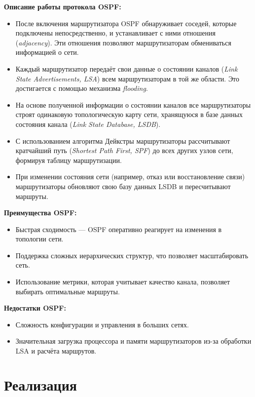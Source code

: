 \documentclass[a4paper,14pt]{extarticle}
\begin{document}
\textbf{Описание работы протокола OSPF:}
\begin{itemize}
    \item После включения маршрутизатора OSPF обнаруживает соседей, которые подключены непосредственно, и устанавливает с ними отношения (\textit{adjacency}). Эти отношения позволяют маршрутизаторам обмениваться информацией о сети.
    \item Каждый маршрутизатор передаёт свои данные о состоянии каналов (\textit{Link State Advertisements, LSA}) всем маршрутизаторам в той же области. Это достигается с помощью механизма \textit{flooding}.
    \item На основе полученной информации о состоянии каналов все маршрутизаторы строят одинаковую топологическую карту сети, хранящуюся в базе данных состояния канала (\textit{Link State Database, LSDB}).
    \item С использованием алгоритма Дейкстры маршрутизаторы рассчитывают кратчайший путь (\textit{Shortest Path First, SPF}) до всех других узлов сети, формируя таблицу маршрутизации.
    \item При изменении состояния сети (например, отказ или восстановление связи) маршрутизаторы обновляют свою базу данных LSDB и пересчитывают маршруты.
\end{itemize}

\textbf{Преимущества OSPF:}
\begin{itemize}
    \item Быстрая сходимость — OSPF оперативно реагирует на изменения в топологии сети.
    \item Поддержка сложных иерархических структур, что позволяет масштабировать сеть.
    \item Использование метрики, которая учитывает качество канала, позволяет выбирать оптимальные маршруты.
\end{itemize}

\textbf{Недостатки OSPF:}
\begin{itemize}
    \item Сложность конфигурации и управления в больших сетях.
    \item Значительная загрузка процессора и памяти маршрутизаторов из-за обработки LSA и расчёта маршрутов.
\end{itemize}

\section{Реализация}
\end{document}
